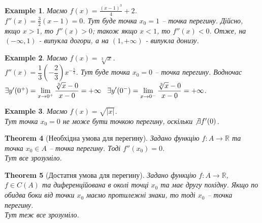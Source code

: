 \documentclass[a4paper, 14pt]{article}
\theoremstyle{theoremdd}
\newtheorem{theorem}{Theorem}[subsection]
\theoremstyle{theoremdd}
\theoremstyle{theoremdd}
\theoremstyle{theoremdd}
\newtheorem{example}[theorem]{Example}
\theoremstyle{theoremdd}
\theoremstyle{theoremdd}
\theoremstyle{theoremdd}
\theoremstyle{theoremdd}
\begin{document}
\begin{example}
Маємо $f(x) = \displaystyle \frac{(x-1)^3}{4} + 2$.\\
$f''(x) = \displaystyle \frac{3}{2}(x-1) = 0$. Тут буде точка $x_0 = 1$ -- точка перегину. Дійсно, якщо $x > 1$, то $f''(x) > 0$; також якщо $x < 1$, то $f''(x) < 0$. Отже, на $(-\infty,1)$ - випукла догори, а на $(1,+\infty)$ - випукла донизу.
\end{example}

\begin{example}
Маємо $f(x) = \sqrt[3]{x}$.\\
$f''(x) = \dfrac{1}{3} \left( -\dfrac{2}{3} \right) x^{-\frac{5}{3}}$. Тут буде точка $x_0 = 0$ -- точка перегину. Водночас \\ $\exists y'(0^+) = \displaystyle \lim_{x \to 0^+} \dfrac{\sqrt[3]{x} - 0}{x - 0} = +\infty \hspace{0.3cm} \exists y'(0^-) = \displaystyle \lim_{x \to 0^-} \dfrac{\sqrt[3]{x} - 0}{x - 0} = +\infty$.
\\ \iffalse %
\begin{figure}[H]
\centering
\begin{tikzpicture}
\draw[thick, ->] (-2,0)--(2,0) node[anchor = north] {$x$};
\draw[thick, ->] (0,-2)--(0,2) node[anchor = east] {$y$};

\draw[red, domain=0.001:1.8, variable=\x, samples = 1000] plot({\x}, {(\x)^(1/3)}) node at (2,1.5) {$f(x)$};
\draw[red, domain=-1.8:-0.001, variable=\x, samples = 1000] plot({\x}, {-(-\x)^(1/3)});
\end{tikzpicture}
\end{figure}
\fi %
\end{example}

\begin{example}
Маємо $f(x) = \sqrt{|x|}$.\\
Тут точка $x_0 = 0$ не може бути точкою перегину, оскільки $\not \exists f'(0)$.
\end{example}


\begin{theorem}[Необхідна умова для перегину]
Задано функцію $f \colon A \to \mathbb{R}$ та точка $x_0 \in A$ -- точка перегину. Тоді $f''(x_0) = 0$.\\
\textit{Тут все зрозуміло.}
\end{theorem}

\begin{theorem}[Достатня умова для перегину]
Задано функцію $f \colon A \to \mathbb{R}$, $f \in C(A)$ та диференційована в околі точці $x_0$ та має другу похідну. Якщо по обидва боки від точки $x_0$ маємо протилежні знаки, то тоді $x_0$ -- точка перегину.\\
\textit{Тут теж все зрозуміло.}
\end{theorem}
\end{document}
